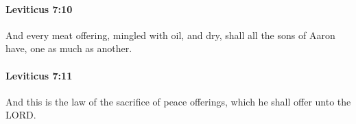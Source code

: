 		\paragraph{Leviticus 7:10} %
			\label{LEVITICUS-7-10}

			And every meat offering, mingled with oil, and dry, shall all the sons of Aaron have, one as much as another.


		\paragraph{Leviticus 7:11} %
			\label{LEVITICUS-7-11}

			And this is the law of the sacrifice of peace offerings, which he shall offer unto the LORD.


